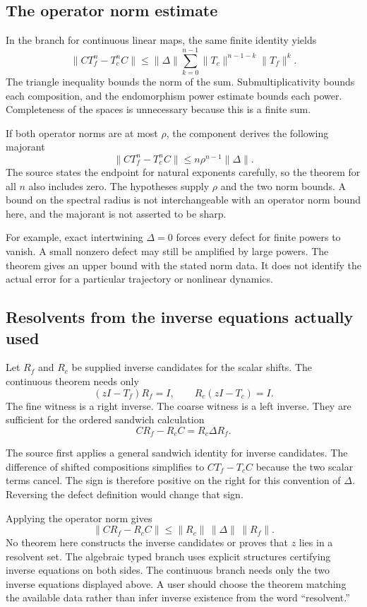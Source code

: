 \subsection{The operator norm estimate}

In the branch for continuous linear maps, the same finite identity yields
\[
\|CT_f^n-T_c^nC\|
\le \|\Delta\|\sum_{k=0}^{n-1}
\|T_c\|^{n-1-k}\|T_f\|^k.
\]
The triangle inequality bounds the norm of the sum. Submultiplicativity bounds each composition, and the endomorphism power estimate bounds each power. Completeness of the spaces is unnecessary because this is a finite sum.

If both operator norms are at most $\rho$, the component derives the following majorant
\[
\|CT_f^n-T_c^nC\|\le n\rho^{n-1}\|\Delta\|.
\]
The source states the endpoint for natural exponents carefully, so the theorem for all $n$ also includes zero. The hypotheses supply $\rho$ and the two norm bounds. A bound on the spectral radius is not interchangeable with an operator norm bound here, and the majorant is not asserted to be sharp.

For example, exact intertwining $\Delta=0$ forces every defect for finite powers to vanish. A small nonzero defect may still be amplified by large powers. The theorem gives an upper bound with the stated norm data. It does not identify the actual error for a particular trajectory or nonlinear dynamics.

\subsection{Resolvents from the inverse equations actually used}

Let $R_f$ and $R_c$ be supplied inverse candidates for the scalar shifts. The continuous theorem needs only
\[
(zI-T_f)R_f=I,\qquad R_c(zI-T_c)=I.
\]
The fine witness is a right inverse. The coarse witness is a left inverse. They are sufficient for the ordered sandwich calculation
\[
CR_f-R_cC=R_c\Delta R_f.
\]

The source first applies a general sandwich identity for inverse candidates. The difference of shifted compositions simplifies to $CT_f-T_cC$ because the two scalar terms cancel. The sign is therefore positive on the right for this convention of $\Delta$. Reversing the defect definition would change that sign.

Applying the operator norm gives
\[
\|CR_f-R_cC\|\le\|R_c\|\,\|\Delta\|\,\|R_f\|.
\]
No theorem here constructs the inverse candidates or proves that $z$ lies in a resolvent set. The algebraic typed branch uses explicit structures certifying inverse equations on both sides. The continuous branch needs only the two inverse equations displayed above. A user should choose the theorem matching the available data rather than infer inverse existence from the word ``resolvent.''

